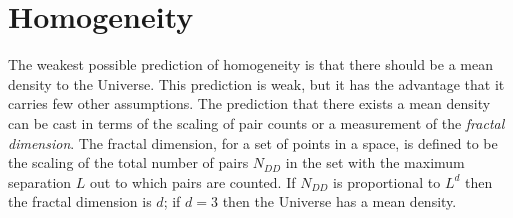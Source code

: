 \documentclass[modern]{aastex631}
\begin{document}
\section{Homogeneity}\label{sec:homo}

The weakest possible prediction of homogeneity is that there should be a mean density to the Universe.
This prediction is weak, but it has the advantage that it carries few other assumptions.
The prediction that there exists a mean density can be cast in terms of the scaling of pair counts or a measurement of the \emph{fractal dimension}.
The fractal dimension, for a set of points in a space, is defined to be the scaling of the total number of pairs $N_{DD}$ in the set with the maximum separation $L$ out to which pairs are counted.
If $N_{DD}$ is proportional to $L^d$ then the fractal dimension is $d$; if $d=3$ then the Universe has a mean density.
\end{document}
